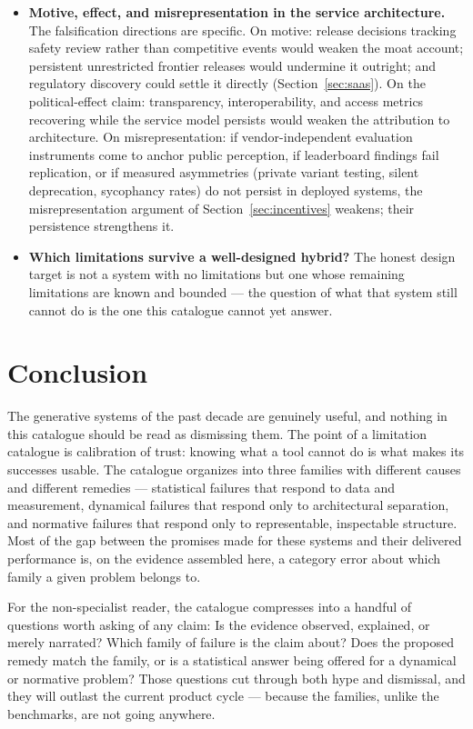 \documentclass[11pt,a4paper]{article}
\begin{document}
\begin{itemize}
\item \textbf{Motive, effect, and misrepresentation in the service
architecture.} The falsification directions are specific. On motive:
release decisions tracking safety review rather than competitive events would
weaken the moat account; persistent unrestricted frontier releases would
undermine it outright; and regulatory discovery could settle it directly
(Section~\ref{sec:saas}). On the political-effect claim: transparency,
interoperability, and access metrics recovering while the service model
persists would weaken the attribution to architecture. On misrepresentation:
if vendor-independent evaluation instruments come to anchor public perception,
if leaderboard findings fail replication, or if measured asymmetries (private
variant testing, silent deprecation, sycophancy rates) do not persist in
deployed systems, the misrepresentation argument of
Section~\ref{sec:incentives} weakens; their persistence strengthens it.

\item \textbf{Which limitations survive a well-designed hybrid?} The honest
design target is not a system with no limitations but one whose remaining
limitations are known and bounded --- the question of what that system still
cannot do is the one this catalogue cannot yet answer.
\end{itemize}

\section{Conclusion}
\label{sec:conclusion}

The generative systems of the past decade are genuinely useful, and nothing
in this catalogue should be read as dismissing them. The point of a
limitation catalogue is calibration of trust: knowing what a tool cannot do
is what makes its successes usable. The catalogue organizes into three
families with different causes and different remedies --- statistical
failures that respond to data and measurement, dynamical failures that
respond only to architectural separation, and normative failures that
respond only to representable, inspectable structure. Most of the gap
between the promises made for these systems and their delivered performance
is, on the evidence assembled here, a category error about which family a
given problem belongs to.

For the non-specialist reader, the catalogue compresses into a handful of
questions worth asking of any claim: Is the evidence observed, explained, or
merely narrated? Which family of failure is the claim about? Does the
proposed remedy match the family, or is a statistical answer being offered
for a dynamical or normative problem? Those questions cut through both hype
and dismissal, and they will outlast the current product cycle --- because
the families, unlike the benchmarks, are not going anywhere.
\end{document}
